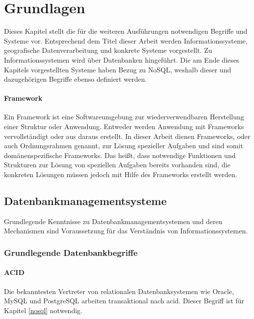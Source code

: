 \chapter{Grundlagen}
\label{Grundlagen}

Dieses Kapitel stellt die für die weiteren Ausführungen notwendigen Begriffe und Systeme vor.
Entsprechend dem Titel dieser Arbeit werden Informationssysteme, geografische Datenverarbeitung und konkrete Systeme vorgestellt.
Zu Informationssystemen wird über Datenbanken hingeführt.
Die am Ende dieses Kapitels vorgestellten Systeme haben Bezug zu NoSQL, weshalb dieser und dazugehörigen Begriffe ebenso definiert werden.


\subsubsection{Framework}
Ein Framework ist eine Softwareumgebung zur wiederverwendbaren Herstellung einer Struktur oder Anwendung.
Entweder werden Anwendung mit Frameworks vervollständigt oder aus daraus erstellt.
In dieser Arbeit dienen Frameworks, oder auch Ordnungsrahmen genannt, zur Lösung spezieller Aufgaben und sind somit domänenspezifische Frameworks.
Das heißt, dass notwendige Funktionen und Strukturen zur Lösung von speziellen Aufgaben bereits vorhanden sind, die konkreten Lösungen müssen jedoch mit Hilfe des Frameworks erstellt werden.

\section{Datenbankmanagementsysteme}

Grundlegende Kenntnisse zu Datenbankmanagementsystemen und deren Mechanismen sind Voraussetzung für das Verständnis von Informationssystemen.

\subsection{Grundlegende Datenbankbegriffe}

\subsubsection{ACID}
Die bekanntesten Vertreter von relationalen Datenbanksystemen wie Oracle, MySQL und PostgreSQL arbeiten transaktional nach \Gls{acid}.
Dieser Begriff ist für Kapitel \ref{nosql} notwendig.

